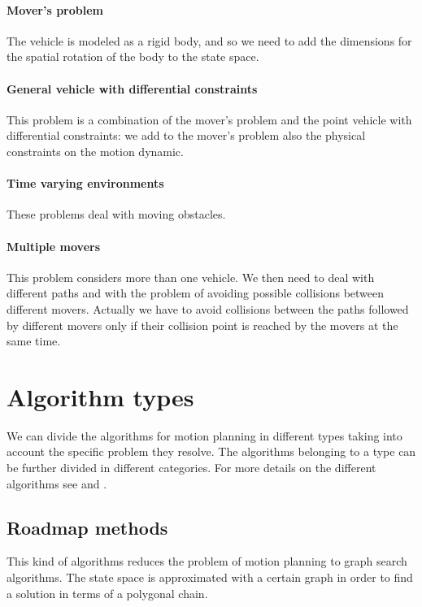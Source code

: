 \documentclass[dissertation.tex]{subfiles}
\begin{document}
\paragraph{Mover's problem}
The vehicle is modeled as a rigid body, and so we need to add the
dimensions for the spatial rotation of the body to the state
space.

\paragraph{General vehicle with differential constraints}
This problem is a combination of the mover's problem and the point vehicle with
differential constraints: we add to the mover's
problem also the physical constraints on the motion dynamic.

\paragraph{Time varying environments}
These problems deal with moving obstacles.

\paragraph{Multiple movers}
This problem considers more than one vehicle. We then need
to deal
with different paths and with the problem of avoiding possible
collisions between different movers. Actually we have to avoid
collisions between the paths followed by different movers only if
their collision point is reached by the movers at the same time.

\section{Algorithm types}
We can divide the algorithms for motion planning in different types
taking into account the specific problem they resolve. The algorithms
belonging to a type can be further divided
in different categories.
For more details on the different algorithms see \cite{goerzen} and
\cite{choset}.

\subsection{Roadmap methods}
This kind of algorithms reduces the problem of motion planning to
graph search algorithms. The state space is approximated with a
certain graph in order to find a solution in terms of a polygonal
chain.
\end{document}
